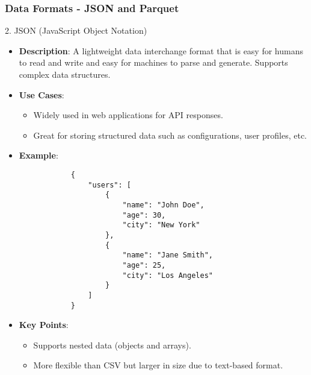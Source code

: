 \documentclass[aspectratio=169]{beamer}
\begin{document}
\begin{frame}[fragile]
    \frametitle{Data Formats - JSON and Parquet}
    \begin{block}{2. JSON (JavaScript Object Notation)}
        \begin{itemize}
            \item \textbf{Description}: A lightweight data interchange format that is easy for humans to read and write and easy for machines to parse and generate. Supports complex data structures.
            \item \textbf{Use Cases}:
            \begin{itemize}
                \item Widely used in web applications for API responses.
                \item Great for storing structured data such as configurations, user profiles, etc.
            \end{itemize}
            \item \textbf{Example}:
            \begin{lstlisting}
            {
                "users": [
                    {
                        "name": "John Doe",
                        "age": 30,
                        "city": "New York"
                    },
                    {
                        "name": "Jane Smith",
                        "age": 25,
                        "city": "Los Angeles"
                    }
                ]
            }
            \end{lstlisting}
            \item \textbf{Key Points}:
            \begin{itemize}
                \item Supports nested data (objects and arrays).
                \item More flexible than CSV but larger in size due to text-based format.
            \end{itemize}
        \end{itemize}
    \end{block}


\end{frame}
\end{document}
